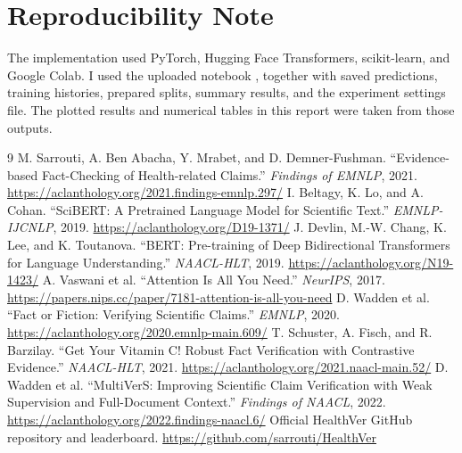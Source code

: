 \documentclass[11pt,letterpaper]{article}
\begin{document}
\section*{Reproducibility Note}
The implementation used PyTorch, Hugging Face Transformers, scikit-learn, and Google Colab. I used the uploaded notebook , together with saved predictions, training histories, prepared splits, summary results, and the experiment settings file. The plotted results and numerical tables in this report were taken from those outputs.

\begin{thebibliography}{9}\small\setlength{\itemsep}{1pt}
 M. Sarrouti, A. Ben Abacha, Y. Mrabet, and D. Demner-Fushman. ``Evidence-based Fact-Checking of Health-related Claims.'' \emph{Findings of EMNLP}, 2021. \url{https://aclanthology.org/2021.findings-emnlp.297/}
 I. Beltagy, K. Lo, and A. Cohan. ``SciBERT: A Pretrained Language Model for Scientific Text.'' \emph{EMNLP-IJCNLP}, 2019. \url{https://aclanthology.org/D19-1371/}
 J. Devlin, M.-W. Chang, K. Lee, and K. Toutanova. ``BERT: Pre-training of Deep Bidirectional Transformers for Language Understanding.'' \emph{NAACL-HLT}, 2019. \url{https://aclanthology.org/N19-1423/}
 A. Vaswani et al. ``Attention Is All You Need.'' \emph{NeurIPS}, 2017. \url{https://papers.nips.cc/paper/7181-attention-is-all-you-need}
 D. Wadden et al. ``Fact or Fiction: Verifying Scientific Claims.'' \emph{EMNLP}, 2020. \url{https://aclanthology.org/2020.emnlp-main.609/}
 T. Schuster, A. Fisch, and R. Barzilay. ``Get Your Vitamin C! Robust Fact Verification with Contrastive Evidence.'' \emph{NAACL-HLT}, 2021. \url{https://aclanthology.org/2021.naacl-main.52/}
 D. Wadden et al. ``MultiVerS: Improving Scientific Claim Verification with Weak Supervision and Full-Document Context.'' \emph{Findings of NAACL}, 2022. \url{https://aclanthology.org/2022.findings-naacl.6/}
 Official HealthVer GitHub repository and leaderboard. \url{https://github.com/sarrouti/HealthVer}
\end{thebibliography}
\end{document}
